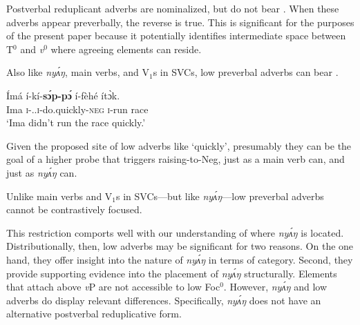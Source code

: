 \documentclass[output=paper,modfonts,nonflat,
hidelinks
]{langsci/langscibook}
\begin{document}
\ea\label{ex:duncan-et-al:18}
\z
\z

\noindent Postverbal reduplicant adverbs are nominalized, but do not bear . When these adverbs appear preverbally, the reverse is true. This is significant for the purposes of the present paper because it potentially identifies intermediate space between T$^0$ and \textit{v}$^0$ where  agreeing elements can reside.

Also like \textit{ny\'{ʌ}ŋ}, main verbs, and V$_1$s in SVCs, low preverbal adverbs can bear .

\ea\label{ex:duncan-et-al:19}
\gll \'{I}má í-kí-\textbf{s\'ɔp-p\'ɔ} í-f\`{e}hé ít\`ɔk. \\
Ima \textsc{i}-{\PST.\FOC}.\textsc{i}-do.quickly-\textsc{neg} \textsc{i}-run race \\
\glt `Ima didn't run the race quickly.'
\z

\noindent Given the proposed site of low adverbs like `quickly', presumably they can be the goal of a higher probe that triggers raising-to-Neg, just as a main verb can, and just as \textit{ny\'{ʌ}ŋ} can. 

Unlike main verbs and V$_1$s in SVCs---but like \textit{ny\'{ʌ}ŋ}---low preverbal adverbs cannot be contrastively focused.

\label{ex:duncan-et-al:20}
\z

\noindent This restriction comports well with our understanding of where \textit{ny\'{ʌ}ŋ} is located. Distributionally, then, low adverbs may be significant for two reasons. On the one hand, they offer insight into the nature of \textit{ny\'{ʌ}ŋ} in terms of category. Second, they provide supporting evidence into the placement of \textit{ny\'{ʌ}ŋ} structurally. Elements that attach above \textit{v}P are not accessible to low Foc$^0$. However, \textit{ny\'{ʌ}ŋ} and low adverbs do display relevant differences. Specifically, \textit{ny\'{ʌ}ŋ} does not have an alternative postverbal reduplicative form.
\end{document}
